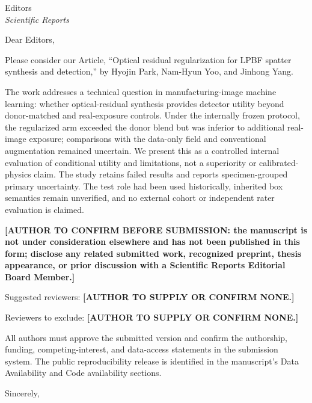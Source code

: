 \documentclass[11pt]{letter}
\begin{document}
\begin{letter}{Editors\\\textit{Scientific Reports}}
\opening{Dear Editors,}

Please consider our Article, ``Optical residual regularization for LPBF spatter synthesis and detection,'' by Hyojin Park, Nam-Hyun Yoo, and Jinhong Yang.

The work addresses a technical question in manufacturing-image machine learning: whether optical-residual synthesis provides detector utility beyond donor-matched and real-exposure controls. Under the internally frozen protocol, the regularized arm exceeded the donor blend but was inferior to additional real-image exposure; comparisons with the data-only field and conventional augmentation remained uncertain. We present this as a controlled internal evaluation of conditional utility and limitations, not a superiority or calibrated-physics claim. The study retains failed results and reports specimen-grouped primary uncertainty. The test role had been used historically, inherited box semantics remain unverified, and no external cohort or independent rater evaluation is claimed.

\textbf{[AUTHOR TO CONFIRM BEFORE SUBMISSION: the manuscript is not under consideration elsewhere and has not been published in this form; disclose any related submitted work, recognized preprint, thesis appearance, or prior discussion with a Scientific Reports Editorial Board Member.]}

Suggested reviewers: \textbf{[AUTHOR TO SUPPLY OR CONFIRM NONE.]}

Reviewers to exclude: \textbf{[AUTHOR TO SUPPLY OR CONFIRM NONE.]}

All authors must approve the submitted version and confirm the authorship, funding, competing-interest, and data-access statements in the submission system. The public reproducibility release is identified in the manuscript's Data Availability and Code availability sections.

\closing{Sincerely,}
\end{letter}
\end{document}
